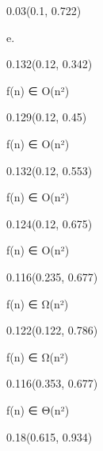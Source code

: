 \documentclass[aspectratio=169]{beamer}
\begin{document}
\begin{frame}[fragile]
\begin{textblock}{0.03}(0.1, 0.722)
  \begin{minipage}[t][0.054\paperheight]{\linewidth}
    {\tiny e.}
  \end{minipage}
\end{textblock}
\begin{textblock}{0.132}(0.12, 0.342)
  \begin{minipage}[t][0.054\paperheight]{\linewidth}
    {\tiny f(n) ∈ O(n²)}
  \end{minipage}
\end{textblock}
\begin{textblock}{0.129}(0.12, 0.45)
  \begin{minipage}[t][0.054\paperheight]{\linewidth}
    {\tiny f(n) ∈ O(n²)}
  \end{minipage}
\end{textblock}
\begin{textblock}{0.132}(0.12, 0.553)
  \begin{minipage}[t][0.054\paperheight]{\linewidth}
    {\tiny f(n) ∈ O(n²)}
  \end{minipage}
\end{textblock}
\begin{textblock}{0.124}(0.12, 0.675)
  \begin{minipage}[t][0.054\paperheight]{\linewidth}
    {\tiny f(n) ∈ O(n²)}
  \end{minipage}
\end{textblock}
\begin{textblock}{0.116}(0.235, 0.677)
  \begin{minipage}[t][0.054\paperheight]{\linewidth}
    {\tiny f(n) ∈ Ω(n²)}
  \end{minipage}
\end{textblock}
\begin{textblock}{0.122}(0.122, 0.786)
  \begin{minipage}[t][0.054\paperheight]{\linewidth}
    {\tiny f(n) ∈ Ω(n²)}
  \end{minipage}
\end{textblock}
\begin{textblock}{0.116}(0.353, 0.677)
  \begin{minipage}[t][0.054\paperheight]{\linewidth}
    {\tiny f(n) ∈ Θ(n²)}
  \end{minipage}
\end{textblock}
\begin{textblock}{0.18}(0.615, 0.934)
  \begin{minipage}[b][0.032\paperheight]{\linewidth}

\end{minipage}
\end{textblock}
\end{frame}
\end{document}
